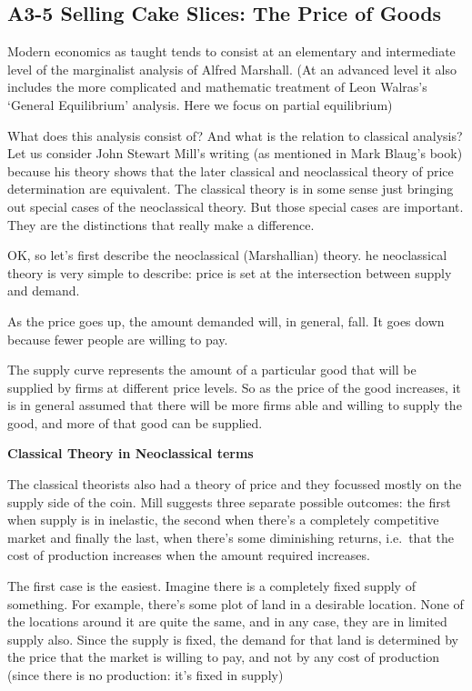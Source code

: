 \documentclass[]{tufte-handout}
\begin{document}
\hypertarget{a3-5-selling-cake-slices-the-price-of-goods}{%
\subsection{A3-5 Selling Cake Slices: The Price of
Goods}\label{a3-5-selling-cake-slices-the-price-of-goods}}

Modern economics as taught tends to consist at an elementary and
intermediate level of the marginalist analysis of Alfred Marshall. (At
an advanced level it also includes the more complicated and mathematic
treatment of Leon Walras's `General Equilibrium' analysis. Here we focus
on partial equilibrium)

What does this analysis consist of? And what is the relation to
classical analysis? Let us consider John Stewart Mill's writing (as
mentioned in Mark Blaug's book) because his theory shows that the later
classical and neoclassical theory of price determination are equivalent.
The classical theory is in some sense just bringing out special cases of
the neoclassical theory. But those special cases are important. They are
the distinctions that really make a difference.

OK, so let's first describe the neoclassical (Marshallian) theory. he
neoclassical theory is very simple to describe: price is set at the
intersection between supply and demand.

As the price goes up, the amount demanded will, in general, fall. It
goes down because fewer people are willing to pay.

The supply curve represents the amount of a particular good that will be
supplied by firms at different price levels. So as the price of the good
increases, it is in general assumed that there will be more firms able
and willing to supply the good, and more of that good can be supplied.

\textbf{Classical Theory in Neoclassical terms}

The classical theorists also had a theory of price and they focussed
mostly on the supply side of the coin. Mill suggests three separate
possible outcomes: the first when supply is in inelastic, the second
when there's a completely competitive market and finally the last, when
there's some diminishing returns, i.e.~that the cost of production
increases when the amount required increases.

The first case is the easiest. Imagine there is a completely fixed
supply of something. For example, there's some plot of land in a
desirable location. None of the locations around it are quite the same,
and in any case, they are in limited supply also. Since the supply is
fixed, the demand for that land is determined by the price that the
market is willing to pay, and not by any cost of production (since there
is no production: it's fixed in supply)
\end{document}
